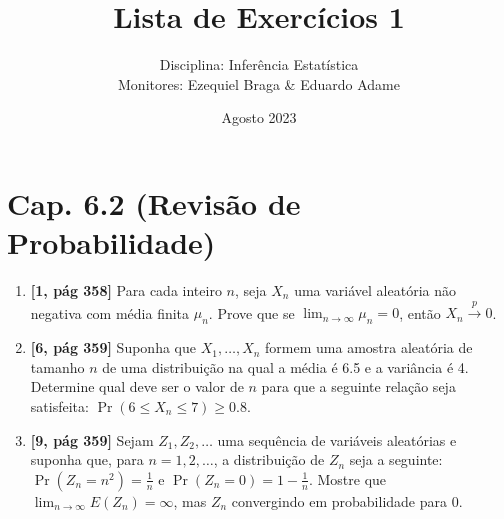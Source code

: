 \documentclass[leqno, 12pt]{article}
\begin{document}
\title{Lista de Exercícios 1}

\author{Disciplina: Inferência Estatística \\
        Monitores: Ezequiel Braga \& Eduardo Adame}

\date{Agosto 2023}

\maketitle

\section*{Cap. 6.2 (Revisão de Probabilidade)}

\begin{enumerate}


\item \textbf{[1, pág 358]} Para cada inteiro \( n \), seja \( X_n \) uma variável aleatória não negativa com média finita \( \mu_n \).
Prove que se \( \lim_{{n \to \infty}} \mu_n = 0 \), então \( X_n \overset{p}{\to} 0 \).


\item \textbf{[6, pág 359]} Suponha que \( X_1, \ldots , X_n \) formem uma amostra aleatória de tamanho \( n \) de uma distribuição na qual a média é 6.5 e a variância é 4.
Determine qual deve ser o valor de \( n \) para que a seguinte relação seja satisfeita: \( \Pr(6 \leq X_n \leq 7) \geq 0.8 \).


\item \textbf{[9, pág 359]} Sejam \( Z_1, Z_2, \ldots \) uma sequência de variáveis aleatórias e suponha que, para \( n = 1, 2, \ldots \), a distribuição de \( Z_n \) seja a seguinte: \( \Pr(Z_n = n^2) = \frac{1}{n} \) e \( \Pr(Z_n = 0) = 1 - \frac{1}{n} \). Mostre que \( \lim_{{n \to \infty}} E(Z_n) = \infty \), mas \( Z_n \) convergindo em probabilidade para 0.

\end{enumerate}
\end{document}
